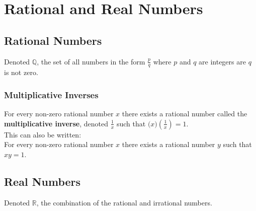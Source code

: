 \documentclass[../notes.tex]{subfiles}
\begin{document}
	\ifSubfilesClassLoaded{\setcounter{chapter}{1}}{}
	\chapter{Rational and Real Numbers}
		\section{Rational Numbers}
			Denoted $\mathbb{Q}$, the set of all numbers in the form $\frac{p}{q}$ where $p$ and $q$ are integers are $q$ is not zero.
			\subsection{Multiplicative Inverses}
				For every non-zero rational number $x$ there exists a rational number called the \textbf{multiplicative inverse}, denoted $\frac{1}{x}$ such that $\bigl(x\bigr)\left(\frac{1}{x}\right) = 1$.\\
				This can also be written:\\
				\-\hspace{2em}For every non-zero rational number $x$ there exists a rational number $y$ such that $xy = 1$.
		\section{Real Numbers}
			Denoted $\mathbb{R}$, the combination of the rational and irrational numbers.
\end{document}
